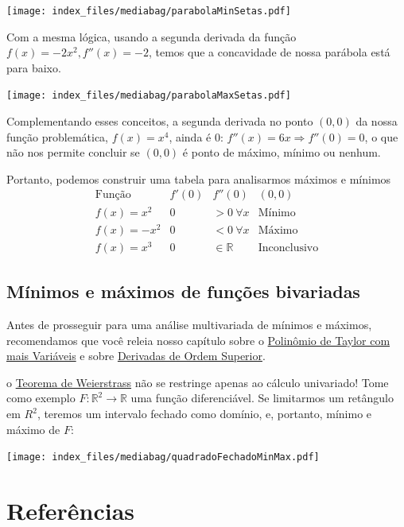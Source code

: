 \documentclass[
  letterpaper,
  DIV=11,
  numbers=noendperiod]{scrreprt}
\begin{document}
\texttt{[image: index\_files/mediabag/parabolaMinSetas.pdf]}

Com a mesma lógica, usando a segunda derivada da função
\(f(x) = -2x^2, f''(x) = -2\), temos que a concavidade de nossa parábola
está para baixo.

\texttt{[image: index\_files/mediabag/parabolaMaxSetas.pdf]}

Complementando esses conceitos, a segunda derivada no ponto \((0,0)\) da
nossa função problemática, \(f(x) = x^4\), ainda é 0:
\(f''(x) = 6x \Rightarrow f''(0) =0\), o que não nos permite concluir se
\((0,0)\) é ponto de máximo, mínimo ou nenhum.

Portanto, podemos construir uma tabela para analisarmos máximos e
mínimos \[
\begin{array}{c|c|c|c}
    \text{Função} & f'(0) & f''(0) & (0,0) \\
    \hline
    f(x) = x^2 &  0 &  > 0 ~\forall x & \text{Mínimo} \\
    f(x) = -x^2 &  0 &  < 0 ~\forall x & \text{Máximo} \\
    f(x) = x^3 &  0 &  \in \mathbb{R} & \text{Inconclusivo} 
\end{array}
\]

\section{Mínimos e máximos de funções
bivariadas}\label{muxednimos-e-muxe1ximos-de-funuxe7uxf5es-bivariadas}

Antes de prosseguir para uma análise multivariada de mínimos e máximos,
recomendamos que você releia nosso capítulo sobre o
\href{taylor-multi.qmd}{Polinômio de Taylor com mais Variáveis} e sobre
\href{d-ordem-superior.qmd}{Derivadas de Ordem Superior}.

o \href{weierstrass.qmd}{Teorema de Weierstrass} não se restringe apenas
ao cálculo univariado! Tome como exemplo
\(F: \mathbb{R}^2 \rightarrow \mathbb{R}\) uma função diferenciável. Se
limitarmos um retângulo em \(R^2\), teremos um intervalo fechado como
domínio, e, portanto, mínimo e máximo de \(F\):

\texttt{[image: index\_files/mediabag/quadradoFechadoMinMax.pdf]}


\chapter*{Referências}\label{referuxeancias}


\printbibliography[heading=none]




\printindex
\end{document}
